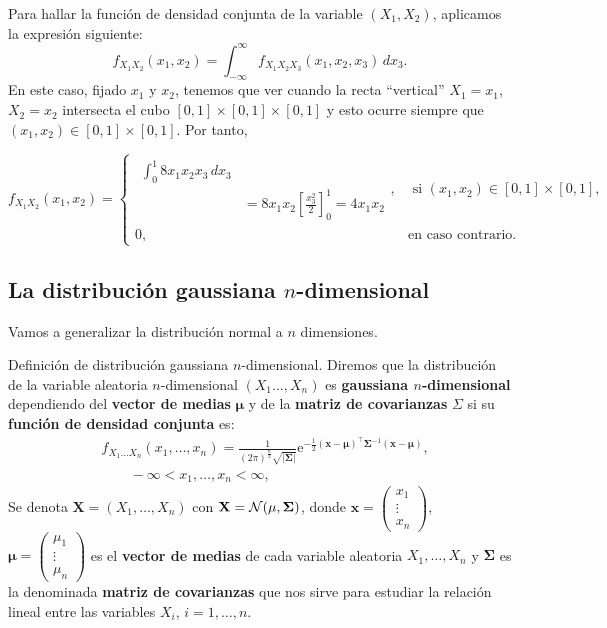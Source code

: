 \documentclass[
  letterpaper,
  DIV=11,
  numbers=noendperiod]{scrreprt}
\begin{document}
Para hallar la función de densidad conjunta de la variable
\((X_1,X_2)\), aplicamos la expresión siguiente: \[
f_{X_1X_2}(x_1,x_2)=\int_{-\infty}^\infty  f_{X_1X_2X_3}(x_1,x_2,x_3)\, dx_3.
\] En este caso, fijado \(x_1\) y \(x_2\), tenemos que ver cuando la
recta ``vertical'' \(X_1=x_1\), \(X_2=x_2\) intersecta el cubo
\([0,1]\times [0,1]\times [0,1]\) y esto ocurre siempre que
\((x_1,x_2)\in [0,1]\times [0,1]\). Por tanto,

\[
f_{X_1X_2}(x_1,x_2)=\begin{cases}
\begin{array}{rl}
\int_{0}^1 8 x_1x_2 x_3  \, dx_3\\ & =8x_1x_2 
\left[\frac{x_3^2}{2}\right]_0^1 =4 x_1 x_2\end{array},
& \mbox{ si }(x_1,x_2)\in [0,1]\times [0,1],\\
0, & \mbox{en caso contrario.}
\end{cases}
\]

\hypertarget{la-distribuciuxf3n-gaussiana-n-dimensional}{%
\subsection{\texorpdfstring{La distribución gaussiana
\(n\)-dimensional}{La distribución gaussiana n-dimensional}}\label{la-distribuciuxf3n-gaussiana-n-dimensional}}

Vamos a generalizar la distribución normal a \(n\) dimensiones.

Definición de distribución gaussiana \(n\)-dimensional. Diremos que la
distribución de la variable aleatoria \(n\)-dimensional
\((X_1\ldots,X_n)\) es \textbf{gaussiana \(n\)-dimensional} dependiendo
del \textbf{vector de medias} \(\mathbf{\mu}\) y de la \textbf{matriz de
covarianzas} \(\Sigma\) si su \textbf{función de densidad conjunta} es:
\[
\begin{array}{rl}
& f_{X_1\ldots X_n}(x_1,\ldots,x_n)=\frac{1}{(2\pi)^{\frac{n}{2}}\sqrt{\mathbf{|\Sigma|}}}\mathrm{e}^{-\frac{1}{2}(\mathbf{x-\mu})^\top\mathbf{\Sigma}^{-1}(\mathbf{x-\mu})},\\ & \qquad  -\infty <x_1,\ldots,x_n<\infty,
\end{array}
\] Se denota \(\mathbf{X}=(X_1,\ldots,X_n)\) con
\(\mathbf{X}={\cal N}(\mathbf{\mu},\mathbf{\Sigma})\), donde
\(\mathbf{x}=\begin{pmatrix}x_1\\\vdots\\ x_n\end{pmatrix}\),
\(\mathbf{\mu}=\begin{pmatrix}\mu_1\\\vdots\\ \mu_n\end{pmatrix}\) es el
\textbf{vector de medias} de cada variable aleatoria \(X_1,\ldots, X_n\)
y \(\mathbf{\Sigma}\) es la denominada \textbf{matriz de covarianzas}
que nos sirve para estudiar la relación lineal entre las variables
\(X_i\), \(i=1,\ldots, n\).
\end{document}
